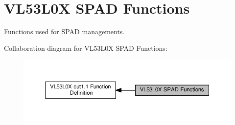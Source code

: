 \hypertarget{group__VL53L0X__SPADfunctions__group}{}\section{V\+L53\+L0X S\+P\+AD Functions}
\label{group__VL53L0X__SPADfunctions__group}


Functions used for S\+P\+AD managements.  


Collaboration diagram for V\+L53\+L0X S\+P\+AD Functions\+:\nopagebreak
\begin{figure}[H]
\begin{center}
\leavevmode
\includegraphics[width=350pt]{group__VL53L0X__SPADfunctions__group}
\end{center}
\end{figure}
